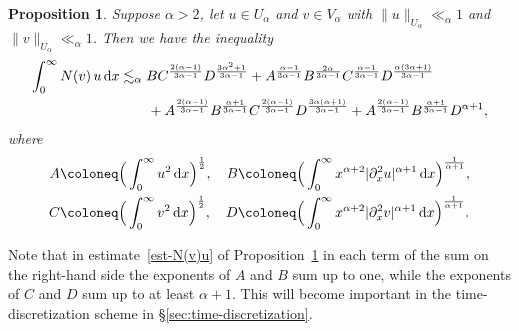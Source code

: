\documentclass[reqno,12pt]{amsart}
\renewcommand{\d}{\ensuremath{\mathrm{d}}}
\renewcommand{\d}{\ensuremath{{\rm d}}}
\newtheorem{proposition}[theorem]{Proposition}
\numberwithin{equation}{section}
\begin{document}
%
\begin{proposition} \label{prop:N(v)u}
Suppose $\alpha > 2$, let $u \in U_\alpha$ and $v \in V_\alpha$ with
$\|u\|_{U_\alpha} \ll_\alpha 1$ and $\|v\|_{U_\alpha} \ll_\alpha 1$. Then we have the inequality
%
\begin{align}\nonumber
    \int_0^\infty N(v)\, u\, \d x
    & \lesssim_\alpha
    B C^\frac{2(\alpha-1)}{3\alpha-1} D^\frac{3\alpha^2+1}{3\alpha-1} 
    +
    A^\frac{\alpha-1}{3\alpha-1}
    B^\frac{2\alpha}{3\alpha-1}
    C^\frac{\alpha-1}{3\alpha-1} 
    D^\frac{\alpha(3\alpha+1)}{3\alpha-1}
    \\
    &\qquad
    + 
    A^\frac{2(\alpha-1)}{3\alpha-1} B^\frac{\alpha+1}{3\alpha-1}
    C^\frac{2(\alpha-1)}{3\alpha-1} 
    D^\frac{3\alpha(\alpha+1)}{3\alpha-1}
    + 
    A^\frac{2(\alpha-1)}{3\alpha-1} B^\frac{\alpha+1}{3\alpha-1} 
    D^{\alpha+1},\label{est-N(v)u}
\end{align}
%
where
%
\begin{align*}
    A &\coloneq \Big(\int_0^\infty u^2\, \d x\Big)^\frac{1}{2},
    \quad
    B \coloneq \Big(\int_0^\infty x^{\alpha+2} |\partial_x^2 u|^{\alpha+1}\, \d x\Big)^\frac{1}{\alpha+1},
    \\
    C & \coloneq \Big(\int_0^\infty v^2\, \d x\Big)^\frac{1}{2},
    \quad
    D \coloneq \Big(\int_0^\infty x^{\alpha+2} |\partial_x^2 v|^{\alpha+1}\, \d x\Big)^\frac{1}{\alpha+1}.
\end{align*}
%
\end{proposition}
%

Note that in estimate~\eqref{est-N(v)u} of Proposition~\ref{prop:N(v)u} in each term of the sum on the right-hand side the exponents of $A$ and $B$ sum up to one, while the exponents of $C$ and $D$ sum up to at least $\alpha+1$. This will become important in the time-discretization scheme in \S\ref{sec:time-discretization}.
\end{document}
